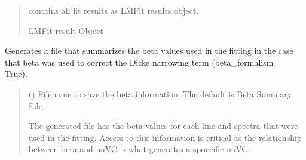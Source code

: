 \documentclass[letterpaper,10pt,english]{sphinxmanual}
\begin{document}
\begin{fulllineitems}
\begin{fulllineitems}
\begin{quote}
\begin{description}
\begin{itemize}
\end{itemize}

\sphinxAtStartPar
{} \textendash{} contains all fit results as LMFit results object.

\sphinxAtStartPar
LMFit result Object

\end{description}\end{quote}

\end{fulllineitems}


\begin{fulllineitems}
\label{\detokenize{MATS:MATS.fit_dataset.Fit_DataSet.generate_beta_output_file}}
\pysigstartsignatures
{}
\pysigstopsignatures
\sphinxAtStartPar
Generates a file that summarizes the beta values used in the fitting in the case that beta was used to correct the Dicke narrowing term (beta\_formalism = True).
\begin{quote}\begin{description}
\sphinxAtStartPar
{} (\sphinxstyleliteralemphasis{\sphinxupquote{, }}) \textendash{} Filename to save the beta information. The default is Beta Summary File.

\sphinxAtStartPar
The generated file has the beta values for each line and spectra that were used in the fitting.  Access to this information is critical as the relationship between beta and nuVC is what generates a spoecific nuVC.

\end{description}\end{quote}

\end{fulllineitems}



\end{fulllineitems}
\end{document}
